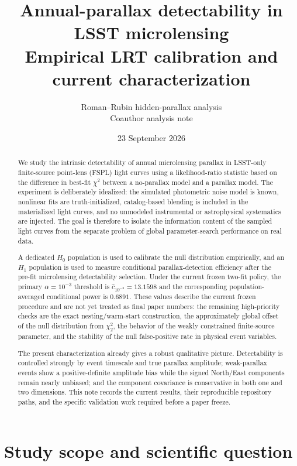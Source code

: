 \documentclass[11pt,a4paper]{article}
\title{Annual-parallax detectability in LSST microlensing\\
\large Empirical LRT calibration and current characterization}
\author{Roman--Rubin hidden-parallax analysis\\\small Coauthor analysis note}
\date{23 September 2026}
\newcommand{\Hnull}{H_0}
\newcommand{\Halt}{H_1}
\begin{document}
\maketitle

\begin{abstract}
We study the intrinsic detectability of annual microlensing parallax in LSST-only
finite-source point-lens (FSPL) light curves using a likelihood-ratio statistic based on the
difference in best-fit $\chi^2$ between a no-parallax model and a parallax model.  The
experiment is deliberately idealized: the simulated photometric noise model is known,
nonlinear fits are truth-initialized, catalog-based blending is included in the materialized
light curves, and no unmodeled instrumental or astrophysical systematics are injected.  The
goal is therefore to isolate the information content of the sampled light curves from the
separate problem of global parameter-search performance on real data.

A dedicated $\Hnull$ population is used to calibrate the null distribution empirically, and
an $\Halt$ population is used to measure conditional parallax-detection efficiency after the
pre-fit microlensing detectability selection.  Under the current frozen two-fit policy, the
primary $\alpha=10^{-3}$ threshold is $\widehat c_{10^{-3}}=13.1598$ and the corresponding
population-averaged conditional power is $0.6891$.  These values describe the current frozen
procedure and are not yet treated as final paper numbers: the remaining high-priority checks
are the exact nesting/warm-start construction, the approximately global offset of the null
distribution from $\chi^2_2$, the behavior of the weakly constrained finite-source parameter,
and the stability of the null false-positive rate in physical event variables.

The present characterization already gives a robust qualitative picture.  Detectability is
controlled strongly by event timescale and true parallax amplitude; weak-parallax events show
a positive-definite amplitude bias while the signed North/East components remain nearly
unbiased; and the component covariance is conservative in both one and two dimensions.  This
note records the current results, their reproducible repository paths, and the specific
validation work required before a paper freeze.
\end{abstract}

\tableofcontents
\clearpage

\section{Study scope and scientific question}
\end{document}
